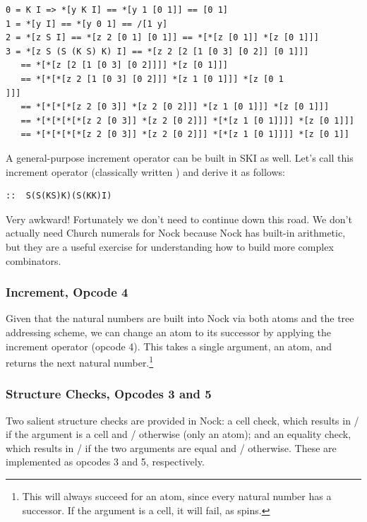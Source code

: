\begin{lstlisting}[style=listingcomb]
0 = K I => *[y K I] == *[y 1 [0 1]] == [0 1]
1 = *[y I] == *[y 0 1] == /[1 y]
2 = *[z S I] == *[z 2 [0 1] [0 1]] == *[*[z [0 1]] *[z [0 1]]]
3 = *[z S (S (K S) K) I] == *[z 2 [2 [1 [0 3] [0 2]] [0 1]]]
   == *[*[z [2 [1 [0 3] [0 2]]]] *[z [0 1]]]
   == *[*[*[z 2 [1 [0 3] [0 2]]] *[z 1 [0 1]]] *[z [0 1
]]]
   == *[*[*[*[z 2 [0 3]] *[z 2 [0 2]]] *[z 1 [0 1]]] *[z [0 1]]]
   == *[*[*[*[*[z 2 [0 3]] *[z 2 [0 2]]] *[*[z 1 [0 1]]]] *[z [0 1]]]
   == *[*[*[*[*[z 2 [0 3]] *[z 2 [0 2]]] *[*[z 1 [0 1]]]] *[z [0 1]]
\end{lstlisting}

A general-purpose increment operator can be built in \textsc{SKI} as well.  Let's call this increment operator  (classically written ) and derive it as follows:

\begin{lstlisting}[style=listingcode]
::  S(S(KS)K)(S(KK)I)
\end{lstlisting}

\noindent
Very awkward!  Fortunately we don't need to continue down this road.  We don't actually need Church numerals for Nock because Nock has built-in arithmetic, but they are a useful exercise for understanding how to build more complex combinators.

\subsubsection{Increment, Opcode 4}

Given that the natural numbers are built into Nock via both atoms and the tree addressing scheme, we can change an atom to its successor by applying the increment operator \textct{+} (opcode 4).  This takes a single argument, an atom, and returns the next natural number.\footnote{This will always succeed for an atom, since every natural number has a successor.  If the argument is a cell, it will fail, as \textct{+[a b]} spins.}



\subsubsection{Structure Checks, Opcodes 3 and 5}

Two salient structure checks are provided in Nock:  a cell check, which results in / if the argument is a cell and / otherwise (only an atom); and an equality check, which results in / if the two arguments are equal and / otherwise.  These are implemented as opcodes 3 and 5, respectively.

